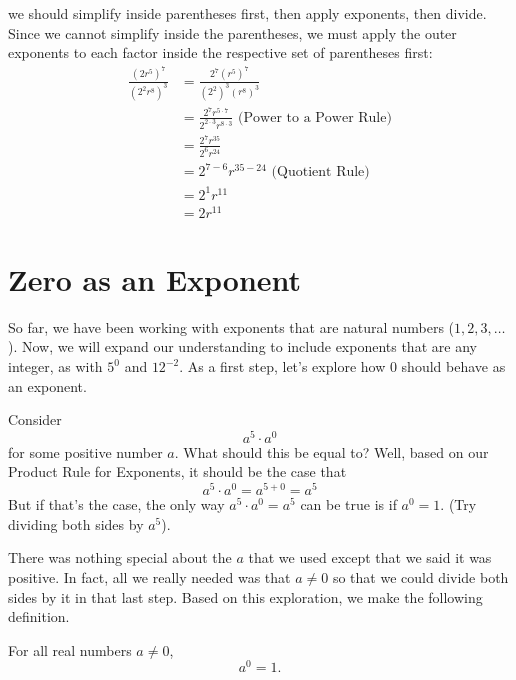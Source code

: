 \documentclass{ximera}
\begin{document}
\begin{example}
\begin{explanation}
\begin{enumerate}
                  we should simplify inside parentheses first,
                  then apply exponents, then divide.
                  Since we cannot simplify inside the parentheses,
                  we must apply the outer exponents to each factor inside the respective set of parentheses first:
                    \begin{align*}
                    \frac{\left(2r^5\right)^7}{\left(2^2 r^8\right)^3}
                    &=  \frac{2^7 \left(r^5\right)^7}{\left(2^2\right)^3 \left(r^8\right)^3} \\[2ex]
                    &= \frac{2^{7} r^{5\cdot 7}}{ 2^{2\cdot 3} r^{8 \cdot 3}} \text{     (Power to a Power Rule)}\\[2ex]
                    &= \frac{2^{7} r^{35}}{ 2^{6} r^{24}}\\[2ex]
		&= 2^{7-6} r^{35-24}\text{     (Quotient Rule)}\\[2ex]
                    &= 2^{1} r^{11}\\[2ex]
                    &= 2 r^{11}
                    \end{align*}
\end{enumerate}
\end{explanation}
\end{example}
\section{Zero as an Exponent}
So far, we have been working with exponents that are natural numbers
      ($1, 2, 3, \ldots$).
Now,  we will expand our understanding to include exponents that are any integer,
      as with $5^{0}$ and $12^{-2}$.
      As a first step,
      let's explore how $0$ should behave as an exponent.

Consider $$a^5 \cdot a^0$$ for some positive number $a$.  What should this be equal to?  Well, based on our Product Rule for Exponents, it should be the case that 
\[
a^5 \cdot a^0 = a^{5+0} = a^5
\]
But if that's the case, the only way $a^5 \cdot a^0=a^5$ can be true is if $a^0=1$.  (Try dividing both sides by $a^5$).

There was nothing special about the $a$ that we used except that we said it was positive.  In fact, all we really needed was that $a \neq 0$ so that we could divide both sides by it in that last step.  Based on this exploration, we make the following definition.

\begin{definition}
For all real numbers $a \neq 0$, $$a^0=1.$$
\end{definition}
\end{document}
